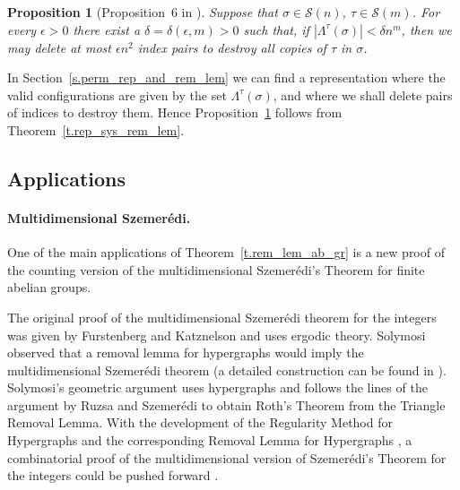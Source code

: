 \documentclass[10pt]{article}
\newtheorem{proposition}[theorem]{Proposition}
\begin{document}
\begin{proposition}[Proposition~6 in \cite{cooper06}]\label{p.rem_lem_permutations}
	Suppose that $\sigma\in \mathcal{S}(n)$, $\tau\in \mathcal{S}(m)$. For every $\epsilon>0$ there exist a $\delta=\delta(\epsilon,m)>0$ such that, if $|\Lambda^{\tau}(\sigma)|<\delta n^m$, then we may delete at most $\epsilon n^2$
	index pairs to destroy all copies of $\tau$ in $\sigma$.
\end{proposition}



In Section~\ref{s.perm_rep_and_rem_lem} we can find a representation where the valid configurations are given by the set $\Lambda^{\tau}(\sigma)$, and where we shall delete pairs of indices to destroy them. Hence Proposition~\ref{p.rem_lem_permutations} follows from Theorem~\ref{t.rep_sys_rem_lem}.






\subsection{Applications} \label{s.intro_applic}



\paragraph{Multidimensional Szemer\'edi.}

One of the main applications of Theorem~\ref{t.rem_lem_ab_gr} is a new proof
of the counting version of the multidimensional Szemer\'edi's Theorem for finite abelian groups.

 The original proof of the multidimensional Szemer\'edi theorem for the integers was given by Furstenberg and Katznelson \cite{furskatz78} and uses ergodic theory. Solymosi \cite{sol04} observed that a removal lemma for hypergraphs would imply the multidimensional Szemer\'edi theorem (a detailed construction can be found in \cite{gow07}). Solymosi's geometric argument uses hypergraphs and follows the lines of the argument by Ruzsa and Szemer\'edi \cite{ruzsze78} to obtain Roth's Theorem \cite{rot53} from the Triangle Removal Lemma. With the development of the Regularity Method for Hypergraphs \cite{gow07,nagrodsch06,rodsko04,tao06} and the corresponding Removal Lemma for Hypergraphs \cite{gow07,nagrodsch06,tao06}, 
a combinatorial proof of the multidimensional version of Szemer\'edi's Theorem for the integers could be pushed forward \cite{gow07,sol04}.
\end{document}
